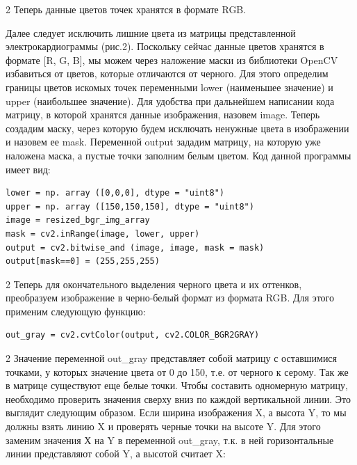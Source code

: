 \begin{multicols}{2}
Теперь данные цветов точек хранятся в формате RGB.

Далее следует исключить лишние цвета из матрицы представленной
электрокардиограммы (рис.2). Поскольку сейчас данные цветов хранятся в
формате {[}R, G, B{]}, мы можем через наложение маски из библиотеки
OpenCV избавиться от цветов, которые отличаются от черного. Для этого
определим границы цветов искомых точек переменными lower (наименьшее
значение) и upper (наибольшее значение). Для удобства при дальнейшем
написании кода матрицу, в которой хранятся данные изображения, назовем
image. Теперь создадим маску, через которую будем исключать ненужные
цвета в изображении и назовем ее mask. Переменной output зададим
матрицу, на которую уже наложена маска, а пустые точки заполним белым
цветом. Код данной программы имеет вид:
\end{multicols}

{\small
\begin{verbatim}
lower = np. array ([0,0,0], dtype = "uint8")
upper = np. array ([150,150,150], dtype = "uint8")
image = resized_bgr_img_array 
mask = cv2.inRange(image, lower, upper)
output = cv2.bitwise_and (image, image, mask = mask)
output[mask==0] = (255,255,255)
\end{verbatim}
}

\begin{multicols}{2}
Теперь для окончательного выделения черного цвета и их оттенков,
преобразуем изображение в черно-белый формат из формата RGB. Для этого
применим следующую функцию:
\end{multicols}

{\small
\begin{verbatim}
out_gray = cv2.cvtColor(output, cv2.COLOR_BGR2GRAY)
\end{verbatim}
}

\begin{multicols}{2}
Значение переменной out\_gray представляет собой матрицу с оставшимися
точками, у которых значение цвета от 0 до 150, т.е. от черного к серому.
Так же в матрице существуют еще белые точки. Чтобы составить одномерную
матрицу, необходимо проверить значения сверху вниз по каждой
вертикальной линии. Это выглядит следующим образом. Если ширина
изображения X, а высота Y, то мы должны взять линию X и проверять черные
точки на высоте Y. Для этого заменим значения Х на Y в переменной
out\_gray, т.к. в ней горизонтальные линии представляют собой Y, а
высотой считает X:
\end{multicols}

